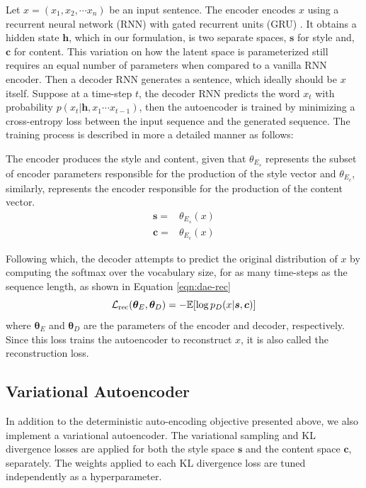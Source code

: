Let $x=(x_1, x_2, \cdots x_n)$ be an input sentence. The encoder encodes $x$ using a recurrent neural network (RNN) with gated recurrent units (GRU) \citep{cho2014learning}. It obtains a hidden state $\bm h$, which in our formulation, is two separate spaces, $\bm s$ for style and, $\bm c$ for content. This variation on how the latent space is parameterized still requires an equal number of parameters when compared to a vanilla RNN encoder. Then a decoder RNN generates a sentence, which ideally should be $x$ itself. Suppose at a time-step $t$, the decoder RNN predicts the word $x_t$ with probability $p(x_t | \bm h, x_1 \cdots x_{t-1})$, then the autoencoder is trained by minimizing a cross-entropy loss between the input sequence and the generated sequence. The training process is described in more a detailed manner as follows:

The encoder produces the style and content, given that $\theta_{E_s}$ represents the subset of encoder parameters responsible for the production of the style vector and $\theta_{E_c}$, similarly, represents the encoder responsible for the production of the content vector.
\begin{align*}
	\bm s =
	 & \theta_{E_s}(x) \nonumber \\
	\bm c =
	 & \theta_{E_c}(x) \nonumber
\end{align*}

Following which, the decoder attempts to predict the original distribution of $x$ by computing the softmax over the vocabulary size, for as many time-steps as the sequence length, as shown in Equation \ref{eqn:dae-rec}
\begin{equation} \label{eqn:dae-rec}
	\mathcal{L}_\text{rec}(\bm\theta_E,\bm\theta_D)= -\mathbb{E}[\log p_D(x|\bm s, \bm c)]
\end{equation}
where $\bm\theta_E$ and $\bm\theta_D$ are the parameters of the encoder and decoder, respectively. Since this loss trains the autoencoder to reconstruct $x$, it is also called the reconstruction loss.


\subsection{Variational Autoencoder}

In addition to the deterministic auto-encoding objective presented above, we also implement a variational autoencoder. The variational sampling and KL divergence losses are applied for both the style space $\bm s$ and the content space $\bm c$, separately. The weights applied to each KL divergence loss are tuned independently as a hyperparameter.

